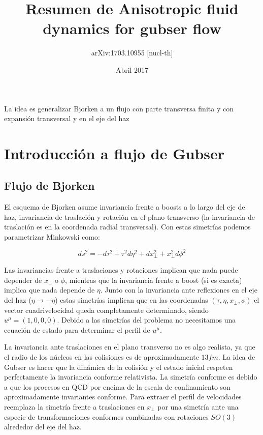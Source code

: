\documentclass[11pt,a4paper]{article}
\begin{document}
\title{\Huge Resumen de Anisotropic fluid dynamics for gubser flow}
\author{\huge  arXiv:1703.10955 [nucl-th]}





\date{Abril 2017}

\renewcommand{\headrulewidth}{0.5pt}




\maketitle

La idea es generalizar Bjorken a un flujo con parte transversa finita y con expansión transversal y en el eje del haz

\section{Introducción a flujo de Gubser}

\subsection{Flujo de Bjorken}
El esquema de Bjorken asume invariancia frente a boosts a lo largo del eje de haz, invariancia de traslación y rotación en el plano transverso (la invariancia de traslación es en la coordenada radial transversal). Con estas simetrías podemos parametrizar Minkowski como:

\begin{equation}
ds^2=-d{\tau}^2+{\tau}^2d{\eta}^2+dx^{2}_{\bot}+x^{2}_{\bot}d{\phi}^2
\end{equation}

Las invariancias frente a traslaciones y rotaciones implican que nada puede depender de $x_{\bot}$ o ${\phi}$, mientras que la invariancia frente a boost (si es exacta) implica que nada depende de $\eta$. Junto con la invariancia ante reflexiones en el eje del haz ($\eta\rightarrow-\eta$) estas simetrías implican que en las coordenadas $(\tau,\eta,x_{\bot},\phi)$ el vector cuadrivelocidad queda completamente determinado, siendo $u^{\mu}=(1,0,0,0)$. Debido a las simetrías del problema no necesitamos una ecuación de estado para determinar el perfil de $u^{\mu}$.

La invariancia ante traslaciones en el plano transverso no es algo realista, ya que el radio de los núcleos en las colisiones es de aproximadamente $13 fm$. La idea de Gubser es hacer que la dinámica de la colisión y el estado inicial respeten perfectamente la invariancia conforme relativista. La simetría conforme es debido a que los procesos en QCD por encima de la escala de confinamiento son aproximadamente invariantes conforme. Para extraer el perfil de velocidades reemplaza la simetría frente a traslaciones en $x_{\bot}$ por una simetría ante una especie de transformaciones conformes combinadas con rotaciones $SO(3)$ alrededor del eje del haz.
\end{document}
